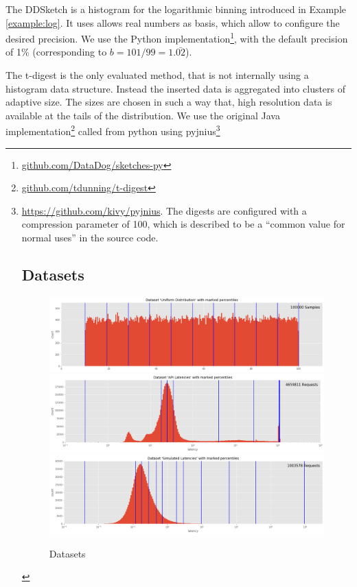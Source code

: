 \documentclass{article}
\theoremstyle{plain}
\theoremstyle{remark}
\begin{document}
The DDSketch is a histogram for the logarithmic binning introduced in Example \ref{example:log}.
It uses allows real numbers as basis, which allow to configure the desired precision.
We use the Python implementation\footnote{\url{github.com/DataDog/sketches-py}}, with the default
precision of 1\% (corresponding to $b=101/99=1.\bar{02}$).

The t-digest is the only evaluated method, that is not internally using a histogram data structure.
Instead the inserted data is aggregated into clusters of adaptive size.  The sizes are chosen in
such a way that, high resolution data is available at the tails of the distribution.  We use the
original Java implementation\footnote{\url{github.com/tdunning/t-digest}} called from python
using pyjnius\footnote{\url{https://github.com/kivy/pyjnius}. The digests are configured with a
compression parameter of 100, which is described to be a ``common value for normal uses'' in
the source code.

\subsection{Datasets}

\begin{figure}
   \includegraphics[width=\textwidth]{evaluation/images/Uniform_Distribution_distribution_percentiles.png}
   \includegraphics[width=\textwidth]{evaluation/images/API_Latencies_distribution_percentiles.png}
   \includegraphics[width=\textwidth]{evaluation/images/Simulated_Latencies_distribution_percentiles.png}
   \caption{Datasets}
   \label{fig:ds}
\end{figure}

}
\end{document}
